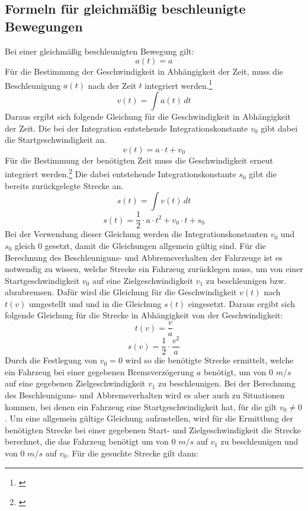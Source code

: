 \subsection{Formeln für gleichmäßig beschleunigte Bewegungen} \label{formulaBeschleunigung}
\noindent Bei einer gleichmäßig beschleunigten Bewegung gilt:
\begin{equation}
a(t) = a
\end{equation}
Für die Bestimmung der Geschwindigkeit in Abhängigkeit der Zeit, muss die Beschleunigung $a(t)$ nach der Zeit $t$ integriert werden.\footnote{\citet[S. 20]{richard2011technische}}
\begin{equation}
v(t) = \int a(t) \,dt
\end{equation}
Daraus ergibt sich folgende Gleichung für die Geschwindigkeit in Abhängigkeit der Zeit. Die bei der Integration entstehende Integrationskonstante $v_{0}$ gibt dabei die Startgeschwindigkeit an.
\begin{equation}
v(t) = a \cdot t + v_{0}
\end{equation} %
Für die Bestimmung der benötigten Zeit muss die Geschwindigkeit erneut integriert werden.\footnote{\citet[S. 20]{richard2011technische}} Die dabei entstehende Integrationskonstante $s_{0}$ gibt die bereits zurückgelegte Strecke an.
\begin{equation}
s(t) = \int v(t) \,dt
\end{equation}
\begin{equation}
s(t) =\frac{1}{2} \cdot a \cdot t^{2} + v_{0}  \cdot t + s_{0}
\end{equation}
Bei der Verwendung dieser Gleichung werden die Integrationskonstanten $v_{0}$ und $s_{0}$ gleich $0$ gesetzt, damit die Gleichungen allgemein gültig sind. Für die Berechnung des Beschleuniguns- und Abbremsverhalten der Fahrzeuge ist es notwendig zu wissen, welche Strecke ein Fahrzeug zurücklegen muss, um von einer Startgeschwindigkeit $v_{0}$ auf eine Zielgeschwindigkeit $v_{1}$ zu beschleunigen bzw. abzubremsen. Dafür wird die Gleichung für die Geschwindigkeit $v(t)$ nach $t(v)$ umgestellt und und in die Gleichung $s(t)$ eingesetzt. Daraus ergibt sich folgende Gleichung für die Strecke in Abhängigkeit von der Geschwindigkeit:
\begin{equation}
t(v) = \frac{v}{a}
\end{equation}
\begin{equation}
s(v) =\frac{1}{2} \cdot \frac{v^{2}}{a}
\end{equation}
Durch die Festlegung von $v_{0} = 0$ wird so die benötigte Strecke ermittelt, welche ein Fahrzeug bei einer gegebenen Bremsverzögerung $a$ benötigt, um von 0 $m/s$ auf eine gegebenen Zielgeschwindigkeit $v_{1}$ zu beschleunigen. Bei der Berechnung des Beschleuniguns- und Abbremsverhalten wird es aber auch zu Situationen kommen, bei denen ein Fahrzeug eine Startgeschwindigkeit hat, für die gilt $v_{0} \neq 0$. Um eine allgemein gültige Gleichung aufzustellen, wird für die Ermittlung der benötigten Strecke bei einer gegebenen Start- und Zielgeschwindigkeit die Strecke berechnet, die das Fahrzeug benötigt um von 0 $m/s$ auf $v_{1}$ zu beschleunigen und von 0 $m/s$ auf $v_{0}$. Für die gesuchte Strecke gilt dann: 
